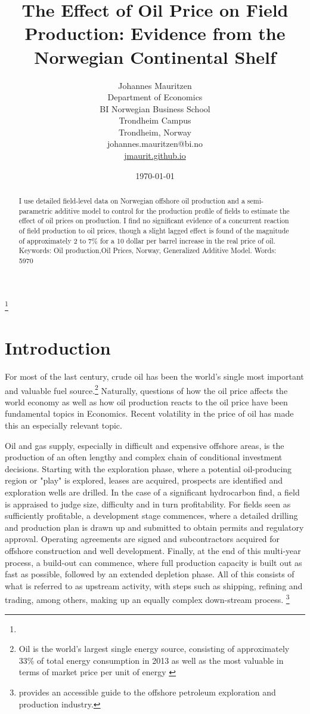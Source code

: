 \documentclass[12pt]{article}
\title{The Effect of Oil Price on Field Production: Evidence from the Norwegian Continental Shelf}
\author{Johannes Mauritzen\\
		Department of Economics\\
        BI Norwegian Business School\\
        Trondheim Campus\\
		Trondheim, Norway\\
        johannes.mauritzen@bi.no\\
        \url{jmaurit.github.io}\\
		}
\date{\today}
\begin{document}
 \begin{spacing}{1} %
	\maketitle

\begin{abstract}
I use detailed field-level data on Norwegian offshore oil production and a semi-parametric additive model to control for the production profile of fields to estimate the effect of oil prices on production.  I find no significant evidence of a concurrent reaction of field production to oil prices, though a slight lagged effect is found of the magnitude of approximately 2 to 7\% for a 10 dollar per barrel increase in the real price of oil.\\
Keywords: Oil production,Oil Prices, Norway, Generalized Additive Model.
Words: 5970
\end{abstract}

\thanks{}
 \end{spacing}

\section{Introduction}

For most of the last century, crude oil has been the world's single most important and valuable fuel source.\footnote{Oil is the world's largest single energy source, consisting of approximately 33\% of total energy consumption in 2013 as well as the most valuable in terms of market price per unit of energy \citep{british_petroleum_statistical_2013}} Naturally, questions of how the oil price affects the world economy as well as how oil production reacts to the oil price have been fundamental topics in Economics. Recent volatility in the price of oil has made this an especially relevant topic. 

Oil and gas supply, especially in difficult and expensive offshore areas, is the production of an often lengthy and complex chain of conditional investment decisions. Starting with the exploration phase, where a potential oil-producing region or "play" is explored, leases are acquired, prospects are identified and exploration wells are drilled. In the case of a significant hydrocarbon find, a field is appraised to judge size, difficulty and in turn profitability. For fields seen as sufficiently profitable, a development stage commences, where a detailed drilling and production plan is drawn up and submitted to obtain permits and regulatory approval. Operating agreements are signed and subcontractors acquired for offshore construction and well development. Finally, at the end of this multi-year process, a build-out can commence, where full production capacity is built out as fast as possible, followed by an extended depletion phase. All of this consists of what is referred to as upstream activity, with steps such as shipping, refining and trading, among others, making up an equally complex down-stream process. \footnote{\citet{leffler_deepwater_2011} provides an accessible guide to the offshore petroleum exploration and production industry.} 
\end{document}
